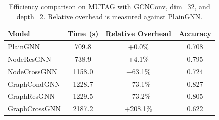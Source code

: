 \begin{table}[t]
\centering
\small
\caption{Efficiency comparison on MUTAG with GCNConv, dim=32, and depth=2. Relative overhead is measured against PlainGNN.}
\label{tab:efficiency}
\begin{tabular}{lccc}
\toprule
Model & Time (s) & Relative Overhead & Accuracy \\
\midrule
PlainGNN & 709.8 & +0.0\% & 0.708 \\
NodeResGNN & 738.9 & +4.1\% & 0.795 \\
NodeCrossGNN & 1158.0 & +63.1\% & 0.724 \\
GraphCondGNN & 1228.7 & +73.1\% & 0.827 \\
GraphResGNN & 1229.5 & +73.2\% & 0.805 \\
GraphCrossGNN & 2187.2 & +208.1\% & 0.622 \\
\bottomrule
\end{tabular}
\end{table}